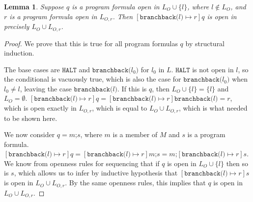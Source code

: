 \documentclass[11pt]{article}
\begin{document}
\newtheorem*{substopenness}{Lemma}
\begin{substopenness}
Suppose $q$ is a program formula open in $L_{O} \cup \{l\}$, where $l \notin L_{O}$, and $r$ is a program formula open in $L_{O,r}$.  Then $[\texttt{branchback(}l\texttt{)} \mapsto r]q$ is open in precisely $L_{O} \cup L_{O,r}$.
\end{substopenness}
\begin{proof}
We prove that this is true for all program formulas $q$ by structural induction.

The base cases are $\texttt{HALT}$ and $\texttt{branchback(}l_0\texttt{)}$ for $l_0$ in $L$. $\texttt{HALT}$ is not open in $l$, so the conditional is vacuously true, which is also the case for $\texttt{branchback(}l_0\texttt{)}$ when $l_0 \neq l$, leaving the case $\texttt{branchback(}l\texttt{)}$.  If this is $q$, then $L_{O} \cup \{l\} = \{l\}$ and $L_{O} = \emptyset$.  $[\texttt{branchback(}l\texttt{)} \mapsto r]q = [\texttt{branchback(}l\texttt{)} \mapsto r]\texttt{branchback(}l\texttt{)} = r$, which is open exactly in $L_{O,r}$, which is equal to $L_{O} \cup L_{O,r}$, which is what needed to be shown here.

We now consider $q = m\texttt{;}s$, where $m$ is a member of $M$ and $s$ is a program formula. $[\texttt{branchback(}l\texttt{)} \mapsto r]q = [\texttt{branchback(}l\texttt{)} \mapsto r]m\texttt{;}s = m\texttt{;}[\texttt{branchback(}l\texttt{)} \mapsto r]s$.  We know from openness rules for sequencing that if $q$ is open in $L_{O} \cup \{l\}$ then so is $s$, which allows us to infer by inductive hypothesis that $[\texttt{branchback(}l\texttt{)} \mapsto r]s$ is open in $L_{O} \cup L_{O,r}$.  By the same openness rules, this implies that $q$ is open in $L_{O} \cup L_{O,r}$.


\end{proof}
\end{document}

